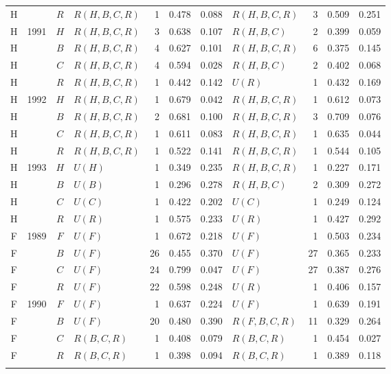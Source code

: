 \documentclass[fleqn,usenatbib]{mnras}
\begin{document}
\begin{minipage}{\textwidth}
\begin{tabular}{ccclrrrlrrr}
H &  & $R$ & $R(H,B,C,R)$ & 1 & 0.478 & 0.088 & $R(H,B,C,R)$ & 3 & 0.509 & 0.251 \\
\addlinespace[2pt]
H & 1991 & $H$ & $R(H,B,C,R)$ & 3 & 0.638 & 0.107 & $R(H,B,C)$ & 2 & 0.399 & 0.059 \\
H &  & $B$ & $R(H,B,C,R)$ & 4 & 0.627 & 0.101 & $R(H,B,C,R)$ & 6 & 0.375 & 0.145 \\
H &  & $C$ & $R(H,B,C,R)$ & 4 & 0.594 & 0.028 & $R(H,B,C)$ & 2 & 0.402 & 0.068 \\
H &  & $R$ & $R(H,B,C,R)$ & 1 & 0.442 & 0.142 & $U(R)$ & 1 & 0.432 & 0.169 \\
\addlinespace[2pt]
H & 1992 & $H$ & $R(H,B,C,R)$ & 1 & 0.679 & 0.042 & $R(H,B,C,R)$ & 1 & 0.612 & 0.073 \\
H &  & $B$ & $R(H,B,C,R)$ & 2 & 0.681 & 0.100 & $R(H,B,C,R)$ & 3 & 0.709 & 0.076 \\
H &  & $C$ & $R(H,B,C,R)$ & 1 & 0.611 & 0.083 & $R(H,B,C,R)$ & 1 & 0.635 & 0.044 \\
H &  & $R$ & $R(H,B,C,R)$ & 1 & 0.522 & 0.141 & $R(H,B,C,R)$ & 1 & 0.544 & 0.105 \\
\addlinespace[2pt]
H & 1993 & $H$ & $U(H)$ & 1 & 0.349 & 0.235 & $R(H,B,C,R)$ & 1 & 0.227 & 0.171 \\
H &  & $B$ & $U(B)$ & 1 & 0.296 & 0.278 & $R(H,B,C)$ & 2 & 0.309 & 0.272 \\
H &  & $C$ & $U(C)$ & 1 & 0.422 & 0.202 & $U(C)$ & 1 & 0.249 & 0.124 \\
H &  & $R$ & $U(R)$ & 1 & 0.575 & 0.233 & $U(R)$ & 1 & 0.427 & 0.292 \\
\midrule
F & 1989 & $F$ & $U(F)$ & 1 & 0.672 & 0.218 & $U(F)$ & 1 & 0.503 & 0.234 \\
F &  & $B$ & $U(F)$ & 26 & 0.455 & 0.370 & $U(F)$ & 27 & 0.365 & 0.233 \\
F &  & $C$ & $U(F)$ & 24 & 0.799 & 0.047 & $U(F)$ & 27 & 0.387 & 0.276 \\
F &  & $R$ & $U(F)$ & 22 & 0.598 & 0.248 & $U(R)$ & 1 & 0.406 & 0.157 \\
\addlinespace[2pt]
F & 1990 & $F$ & $U(F)$ & 1 & 0.637 & 0.224 & $U(F)$ & 1 & 0.639 & 0.191 \\
F &  & $B$ & $U(F)$ & 20 & 0.480 & 0.390 & $R(F,B,C,R)$ & 11 & 0.329 & 0.264 \\
F &  & $C$ & $R(B,C,R)$ & 1 & 0.408 & 0.079 & $R(B,C,R)$ & 1 & 0.454 & 0.027 \\
F &  & $R$ & $R(B,C,R)$ & 1 & 0.398 & 0.094 & $R(B,C,R)$ & 1 & 0.389 & 0.118 \\
\addlinespace[2pt]

\end{tabular}
\end{minipage}
\end{document}
